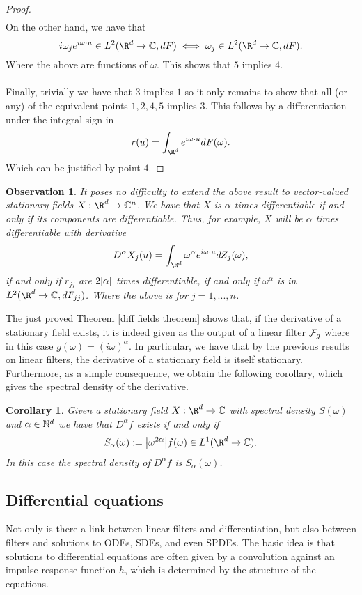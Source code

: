 \documentclass[12pt]{article}
\newtheorem{observation}{Observation}
\newtheorem{corollary}{Corollary}
\begin{document}
\begin{proof}
\begin{multline*}
    \end{multline*}
    On the other hand, we have that $$i\omega_je^{i\omega\cdot u}\in L^2(\R^d\to\C,dF)\iff\omega_j\in L^2(\R^d\to\C,dF).$$
    Where the above are functions of $\omega$. This shows that $5$ implies $4$.
    \\
    \\
    Finally, trivially we have that $3$ implies $1$ so it only remains to show that all (or any) of the equivalent points $1,2,4,5$ implies $3$. This follows by a differentiation under the integral sign in
    \begin{equation*}
        r(u)=\int_{\R^d}e^{i\omega\cdot u}dF(\omega).
    \end{equation*}
    Which can be justified by point $4$.
\end{proof}
\begin{observation}
    It poses no difficulty to extend the above result to vector-valued stationary fields $X:\R^d\to\C^n$.
    We have that $X$ is $\alpha$ times differentiable
    if and only if its components are differentiable. Thus, for example, $X$ will be $\alpha$ times differentiable with derivative
    \begin{equation*}
        D^\alpha X_j(u)=\int_{\R^d}\omega^{\alpha}e^{i\omega\cdot u}dZ_j(\omega),
    \end{equation*}
    if and only if $r_{jj}$ are $2\abs{\alpha}$ times differentiable, if and only if $\omega^\alpha$ is in\\ $L^2(\R^d\to\C, dF_{jj})$. Where the above is for $j=1,...,n$.
\end{observation}
The just proved Theorem \ref{diff fields theorem} shows that, if the derivative of a stationary field exists, it is indeed given as the output of a linear filter $\mathcal{F}_g$ where in this case $g(\omega)=(i\omega)^\alpha$. In particular, we have that by the previous results on linear filters, the derivative of a stationary field is itself stationary. Furthermore, as a simple consequence, we obtain the following corollary,
which gives the spectral density of the derivative.
\begin{corollary}\label{density of derivative}
    Given a stationary field $X:\R^d\to\C$ with spectral density $S(\omega)$
    and $\alpha\in \mathbb{N}^d$ we have that $D^\alpha f$ exists if and only if $$S_\alpha(\omega):=\abs{\omega^{2\alpha}} f(\omega)\in L^1(\R^d\to\C).$$ In this case the spectral density of $D^\alpha f$ is $S_\alpha(\omega)$.
\end{corollary}
\subsection{Differential equations}\label{differential equations section}
Not only is there a link between linear filters and differentiation, but also between filters and solutions to ODEs, SDEs, and even SPDEs. The basic idea is that solutions to differential equations are often given by a convolution against an impulse response function $h$, which is determined by the structure of the equations.
\end{document}
